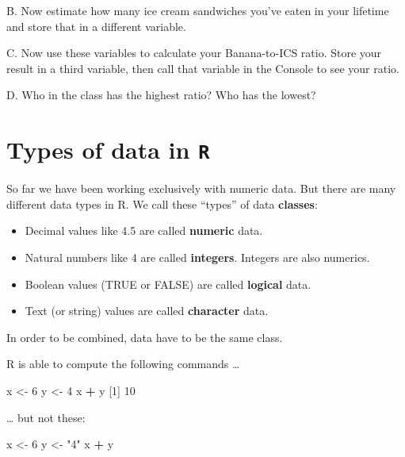 \documentclass[
]{book}
\newenvironment{Shaded}{\begin{snugshade}}{\end{snugshade}}
\newcommand{\DecValTok}[1]{\textcolor[rgb]{0.00,0.00,0.81}{#1}}
\newcommand{\NormalTok}[1]{#1}
\newcommand{\OperatorTok}[1]{\textcolor[rgb]{0.81,0.36,0.00}{\textbf{#1}}}
\newcommand{\StringTok}[1]{\textcolor[rgb]{0.31,0.60,0.02}{#1}}
\providecommand{\tightlist}{%
  \setlength{\itemsep}{0pt}\setlength{\parskip}{0pt}}
\begin{document}
B. Now estimate how many ice cream sandwiches you've eaten in your lifetime and store that in a different variable.

C. Now use these variables to calculate your Banana-to-ICS ratio. Store your result in a third variable, then call that variable in the Console to see your ratio.

D. Who in the class has the highest ratio? Who has the lowest?

\hypertarget{types-of-data-in-r}{%
\section*{\texorpdfstring{Types of data in \texttt{R}}{Types of data in R}}\label{types-of-data-in-r}}

So far we have been working exclusively with numeric data. But there are many different data types in R. We call these ``types'' of data \textbf{classes}:

\begin{itemize}
\tightlist
\item
  Decimal values like 4.5 are called \textbf{numeric} data.
\item
  Natural numbers like 4 are called \textbf{integers}. Integers are also numerics.
\item
  Boolean values (TRUE or FALSE) are called \textbf{logical} data.
\item
  Text (or string) values are called \textbf{character} data.
\end{itemize}

In order to be combined, data have to be the same class.

R is able to compute the following commands \ldots{}

\begin{Shaded}
\begin{Highlighting}[]
\NormalTok{x <-}\StringTok{ }\DecValTok{6}
\NormalTok{y <-}\StringTok{ }\DecValTok{4}
\NormalTok{x }\OperatorTok{+}\StringTok{ }\NormalTok{y}
\NormalTok{[}\DecValTok{1}\NormalTok{] }\DecValTok{10}
\end{Highlighting}
\end{Shaded}

\ldots{} but not these:

\begin{Shaded}
\begin{Highlighting}[]
\NormalTok{x <-}\StringTok{ }\DecValTok{6}
\NormalTok{y <-}\StringTok{ "4"}
\NormalTok{x }\OperatorTok{+}\StringTok{ }\NormalTok{y}
\end{Highlighting}
\end{Shaded}
\end{document}
